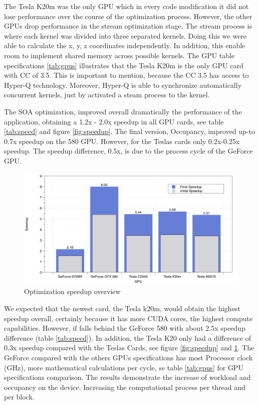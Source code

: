 The Tesla K20m was the only GPU which in every code modification it did not lose performance over the course of the optimization process. However, the other GPUs drop performance in the stream optimization stage. The stream process is where each kernel was divided into three separated kernels. Doing this we were able to calculate the x, y, z coordinates independently. In addition, this enable room to implement shared memory across possible kernels. The GPU table specifications \ref{tab:gpus} illustrates that the Tesla K20m is the only GPU card with CC of 3.5. This is important to mention, because the CC 3.5 has access to Hyper-Q technology. Moreover, Hyper-Q is able to synchronize automatically concurrent kernels, just by activated a steam process to the kernel.

The SOA optimization, improved overall dramatically the performance of the application, obtaining a 1.2x - 2.0x speedup in all GPU cards, see table \ref{tab:speed} and figure \ref{fig:speedup}. The final version, Occupancy, improved up-to 0.7x speedup on the 580 GPU. However, for the Teslas cards only 0.2x-0.25x speedup. The speedup difference, 0.5x,  is due to the process cycle of the GeForce GPU. 

\begin{figure}[htbp]
	\centering
		\includegraphics[width=1.0\textwidth]{Figures/speed.png}
		\smallskip
	\caption[Optimization speedup overview]{Optimization speedup overview}
	\label{fig:speeduplast}
\end{figure}


We expected that the newest card, the Tesla k20m, would obtain the highest speedup overall, certainly because it has more CUDA cores, the highest compute capabilities. However, if falls behind the GeForce 580 with about 2.5x speedup difference (table \ref{tab:speed}). In addition, the Tesla K20 only had a difference of 0.3x speedup compared with the Teslas Cards, see figure \ref{fig:speedup} and \ref{fig:speeduplast}. The GeForce compared with the others GPUs specifications has most Processor clock (GHz), more mathematical calculations per cycle, se table \ref{tab:gpus} for GPU specifications comparison. The results demonstrate the increase of workload and occupancy on the device. Increasing the computational process per thread and per block.


